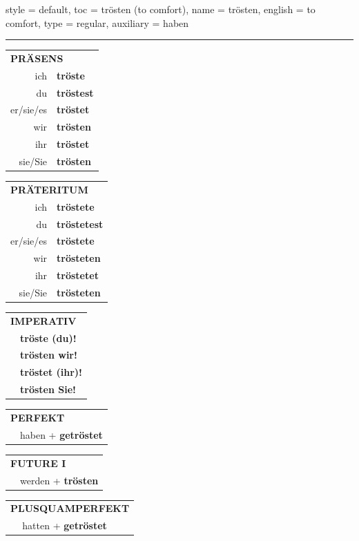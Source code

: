 \begin{verbentry}{
  style = {default},
  toc = {trösten (to comfort)},
  name = {trösten},
  english = {to comfort},
  type = {regular},
  auxiliary = {haben}
}


\vspace{5pt}
\hrule
\vspace{5pt}

\begin{tabular}{rl}
\multicolumn{2}{l}{\textbf{PRÄSENS}}\\
ich & \textbf{tröste}\\
du & \textbf{tröstest}\\
er/sie/es & \textbf{tröstet}\\
wir & \textbf{trösten}\\
ihr & \textbf{tröstet}\\
sie/Sie & \textbf{trösten}\\
\end{tabular}
\hfill
\begin{tabular}{rl}
\multicolumn{2}{l}{\textbf{PRÄTERITUM}}\\
ich & \textbf{tröstete}\\
du & \textbf{tröstetest}\\
er/sie/es & \textbf{tröstete}\\
wir & \textbf{trösteten}\\
ihr & \textbf{tröstetet}\\
sie/Sie & \textbf{trösteten}\\
\end{tabular}
\hfill
\begin{tabular}{rl}
\multicolumn{2}{l}{\textbf{IMPERATIV}}\\
& \textbf{tröste (du)!}\\
& \textbf{trösten wir!}\\
& \textbf{tröstet (ihr)!}\\
& \textbf{trösten Sie!}\\
\end{tabular}

\vspace{10pt}

\begin{tabular}{rl}
\multicolumn{2}{l}{\textbf{PERFEKT}}\\
& haben + \textbf{getröstet}\\
\end{tabular}
\hfill
\begin{tabular}{rl}
\multicolumn{2}{l}{\textbf{FUTURE I}}\\
& werden + \textbf{trösten}\\
\end{tabular}
\hfill
\begin{tabular}{rl}
\multicolumn{2}{l}{\textbf{PLUSQUAMPERFEKT}}\\
& hatten + \textbf{getröstet}\\
\end{tabular}


\end{verbentry}
